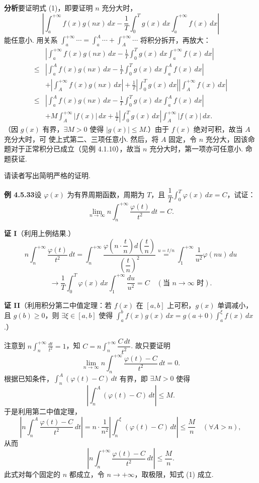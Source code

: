 \documentclass[UTF8,12pt,a4paper,fontset=fandol]{ctexart}
\begin{document}
\noindent\textbf{分析}\quad 要证明式 (1)，即要证明 $n$ 充分大时，
\begin{equation}
\left|\int_a^{+\infty}f(x)g(nx)\,dx-\frac1T\int_0^Tg(x)\,dx\int_a^{+\infty}f(x)\,dx\right| \tag{2}
\end{equation}
能任意小. 用关系 $\displaystyle\int_a^{+\infty}\cdots=\int_a^A\cdots+\int_A^{+\infty}\cdots$ 将积分拆开，再放大：
\[
\begin{aligned}
&\left|\int_a^{+\infty}f(x)g(nx)\,dx-\frac1T\int_0^Tg(x)\,dx\int_a^{+\infty}f(x)\,dx\right|\\
\le{}&
\left|\int_a^A f(x)g(nx)\,dx-\frac1T\int_0^Tg(x)\,dx\int_a^A f(x)\,dx\right|\\
&+\left|\int_A^{+\infty}f(x)g(nx)\,dx\right|
+\frac1T\left|\int_0^Tg(x)\,dx\right|\left|\int_A^{+\infty}f(x)\,dx\right|\\
\le{}&
\left|\int_a^A f(x)g(nx)\,dx-\frac1T\int_0^Tg(x)\,dx\int_a^A f(x)\,dx\right|\\
&+M\int_A^{+\infty}|f(x)|\,dx
+\frac1T\left|\int_0^Tg(x)\,dx\right|\int_A^{+\infty}|f(x)|\,dx.
\end{aligned}
\]
（因 $g(x)$ 有界，$\exists M>0$ 使得 $|g(x)|\le M$.）由于 $f(x)$ 绝对可积，故当 $A$ 充分大时，可
使上式第二、三项任意小. 然后，将 $A$ 固定，令 $n$ 充分大，因该命题对于正常积分已成立（见例 4.1.10），故当 $n$ 充分大时，第一项亦可任意小. 命题获证.

请读者写出简明严格的证明.

\noindent\textbf{例 4.5.33}\quad 设 $\varphi(x)$ 为有界周期函数，周期为 $T$，且 $\dfrac1T\int_0^T\varphi(x)\,dx=C$，试证：
\begin{equation}
\lim_{n\to\infty}n\int_n^{+\infty}\frac{\varphi(t)}{t^2}\,dt=C. \tag{1}
\end{equation}

\noindent\textbf{证 I}\quad （利用上例结果.）
\[
n\int_n^{+\infty}\frac{\varphi(t)}{t^2}\,dt
=\int_n^{+\infty}\frac{\varphi\left(n\cdot\dfrac tn\right)d\left(\dfrac tn\right)}
{\left(\dfrac tn\right)^2}
\stackrel{u=t/n}{=}\int_1^{+\infty}\frac1{u^2}\varphi(nu)\,du
\]
\[
\longrightarrow\frac1T\int_0^T\varphi(x)\,dx\int_1^{+\infty}\frac{du}{u^2}
=C\quad(\text{当 }n\to\infty\text{ 时}).
\]

\noindent\textbf{证 II}\quad （利用积分第二中值定理：若 $f(x)$ 在 $[a,b]$ 上可积，$g(x)$ 单调减小，且
$g(b)\ge0$，则 $\exists\xi\in[a,b]$ 使得 $\displaystyle\int_a^b f(x)g(x)\,dx
=g(a+0)\int_a^\xi f(x)\,dx$.）

注意到 $\displaystyle n\int_n^{+\infty}\frac{dt}{t^2}=1$，知
$C=n\int_n^{+\infty}\dfrac{C\,dt}{t^2}$. 故只要证明
\[
\lim_{n\to\infty}n\int_n^{+\infty}\frac{\varphi(t)-C}{t^2}\,dt=0.
\]
根据已知条件，$\displaystyle\int_n^A(\varphi(t)-C)\,dt$ 有界，即 $\exists M>0$ 使得
\[
\left|\int_n^A(\varphi(t)-C)\,dt\right|\le M.
\]
于是利用第二中值定理，
\[
\left|n\int_n^A\frac{\varphi(t)-C}{t^2}\,dt\right|
=n\cdot\frac1{n^2}\left|\int_n^\xi(\varphi(t)-C)\,dt\right|
\le\frac Mn\quad(\forall A>n),
\]
从而
\[
\left|n\int_n^{+\infty}\frac{\varphi(t)-C}{t^2}\,dt\right|\le\frac Mn.
\]
此式对每个固定的 $n$ 都成立，令 $n\to+\infty$，取极限，知式 (1) 成立.
\end{document}
